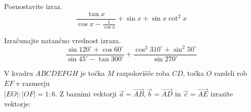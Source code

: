 \documentclass[addpoints]{exam}
\begin{document}
\begin{questions}


    \question[3]
    Poenostavite izraz. 
    $$ \dfrac{\tan x}{\cos x - \frac{1}{\cos x}}+\sin x + \sin x \cot^2 x$$

       



    \question[4]
    Izračunajte natančno vrednost izraza. 
    $$ \dfrac{\sin{120^\circ} + \cos{60^\circ}}{\sin{45^\circ} - \tan{300^\circ}}+\dfrac{\cos^2{310^\circ}+\sin^2{50^\circ}}{\sin{270^\circ}}$$

       



    \question
    V kvadru $ABCDEFGH$ je točka $M$ razpolovišče roba $CD$, točka $O$ razdeli rob $EF$ v razmerju \\ $|EO|:|OF|=1:6$.
    Z baznimi vektorji $\overrightarrow{a}=\overrightarrow{AB}, \overrightarrow{b}=\overrightarrow{AD}$ in $\overrightarrow{c}=\overrightarrow{AE}$ izrazite vektorje: 



    


\end{questions}
\end{document}
